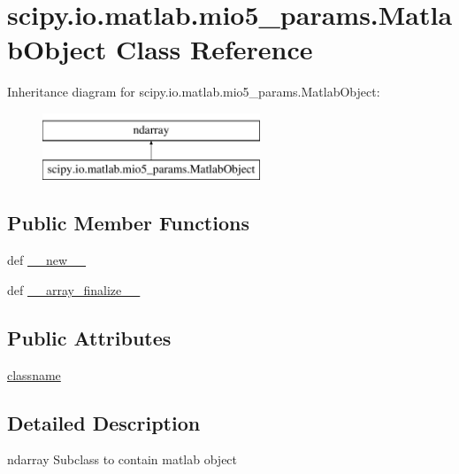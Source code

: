 \hypertarget{classscipy_1_1io_1_1matlab_1_1mio5__params_1_1MatlabObject}{}\section{scipy.\+io.\+matlab.\+mio5\+\_\+params.\+Matlab\+Object Class Reference}
\label{classscipy_1_1io_1_1matlab_1_1mio5__params_1_1MatlabObject}
Inheritance diagram for scipy.\+io.\+matlab.\+mio5\+\_\+params.\+Matlab\+Object\+:\begin{figure}[H]
\begin{center}
\leavevmode
\includegraphics[height=2.000000cm]{classscipy_1_1io_1_1matlab_1_1mio5__params_1_1MatlabObject}
\end{center}
\end{figure}
\subsection*{Public Member Functions}
\begin{DoxyCompactItemize}
\item 
def \hyperlink{classscipy_1_1io_1_1matlab_1_1mio5__params_1_1MatlabObject_a46d0a66f80f029ab7fdb3d78259bf940}{\+\_\+\+\_\+new\+\_\+\+\_\+}
\item 
def \hyperlink{classscipy_1_1io_1_1matlab_1_1mio5__params_1_1MatlabObject_a775cfc32dbaa83c6fb01c98b2ac69a73}{\+\_\+\+\_\+array\+\_\+finalize\+\_\+\+\_\+}
\end{DoxyCompactItemize}
\subsection*{Public Attributes}
\begin{DoxyCompactItemize}
\item 
\hyperlink{classscipy_1_1io_1_1matlab_1_1mio5__params_1_1MatlabObject_ab74473403e05b10c6a36cd8a97fd992d}{classname}
\end{DoxyCompactItemize}


\subsection{Detailed Description}
\begin{DoxyVerb}ndarray Subclass to contain matlab object \end{DoxyVerb}
 

